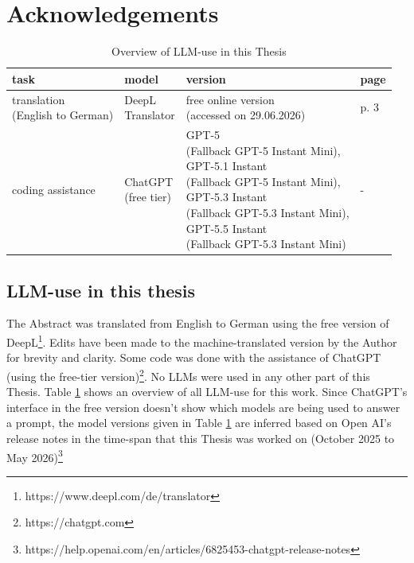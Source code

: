 \documentclass[12pt,a4paper]{report}
\begin{document}
\chapter*{Acknowledgements}
\begin{table}
  \centering
  \begin{tabular}{llll}
    \toprule
    task&model&version&page\\
    \midrule
    \makecell[l]{translation \\(English to German)} & \makecell[l]{DeepL\\Translator} & \makecell[l]{free online version\\(accessed on 29.06.2026)}& p. 3\\
    \midrule
    coding assistance & \makecell[l]{ChatGPT \\(free tier)} & \makecell[l]{GPT-5 \\(Fallback GPT-5 Instant Mini), \\GPT-5.1 Instant \\(Fallback GPT-5 Instant Mini), \\GPT-5.3 Instant \\(Fallback GPT-5.3 Instant Mini), \\GPT-5.5 Instant \\(Fallback GPT-5.3 Instant Mini)}& -\\
    \bottomrule
  \end{tabular}
  \caption{Overview of LLM-use in this Thesis}
  \label{tab:my_llm_use}
\end{table}
\section*{LLM-use in this thesis}
The Abstract was translated from English to German using the free version of DeepL\footnote{https://www.deepl.com/de/translator}.
Edits have been made to the machine-translated version by the Author for brevity and clarity.
Some code was done with the assistance of ChatGPT (using the free-tier version)\footnote{https://chatgpt.com}.
No LLMs were used in any other part of this Thesis. 
Table \ref{tab:my_llm_use} shows an overview of all LLM-use for this work.
Since ChatGPT's interface in the free version doesn't show which models are being used to answer a prompt, the model versions given in Table \ref{tab:my_llm_use} are inferred based on Open AI's release notes in the time-span that this Thesis was worked on (October 2025 to May 2026)\footnote{https://help.openai.com/en/articles/6825453-chatgpt-release-notes}
\end{document}
